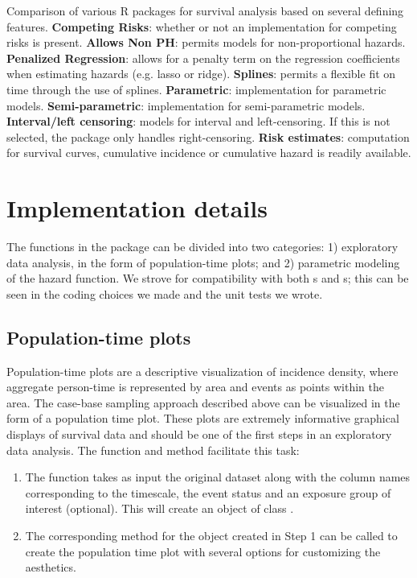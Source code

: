 \begin{table}[ht]
{}
\caption{Comparison of various R packages for survival analysis based on several defining features. \textbf{Competing Risks}: whether or not an implementation for competing risks is present. \textbf{Allows Non PH}: permits models for non-proportional hazards. \textbf{Penalized Regression}: allows for a penalty term on the regression coefficients when estimating hazards (e.g. lasso or ridge). \textbf{Splines}: permits a flexible fit on time through the use of splines. \textbf{Parametric}: implementation for parametric models. \textbf{Semi-parametric}: implementation for semi-parametric models. \textbf{Interval/left censoring}: models for interval and left-censoring. If this is not selected, the package only handles right-censoring. \textbf{Risk estimates}: computation for survival curves, cumulative incidence or cumulative hazard is readily available.}
\label{tab:surv-pkgs}
\end{table}

\hypertarget{implementation-details}{%
\section{Implementation details}\label{implementation-details}}

The functions in the  package can be divided into two
categories: 1) exploratory data analysis, in the form of population-time
plots; and 2) parametric modeling of the hazard function. We strove for
compatibility with both s and s; this
can be seen in the coding choices we made and the unit tests we wrote.

\hypertarget{population-time-plots}{%
\subsection{Population-time plots}\label{population-time-plots}}

Population-time plots are a descriptive visualization of incidence
density, where aggregate person-time is represented by area and events
as points within the area. The case-base sampling approach described
above can be visualized in the form of a population time plot. These
plots are extremely informative graphical displays of survival data and
should be one of the first steps in an exploratory data analysis. The
 function and  method facilitate this task:

\begin{enumerate}
\def\labelenumi{\arabic{enumi}.}
\tightlist
\item
  The  function takes as input the original
  dataset along with the column names corresponding to the timescale,
  the event status and an exposure group of interest (optional). This
  will create an object of class .\\
\item
  The corresponding  method for the object created in Step 1
  can be called to create the population time plot with several options
  for customizing the aesthetics.
\end{enumerate}

